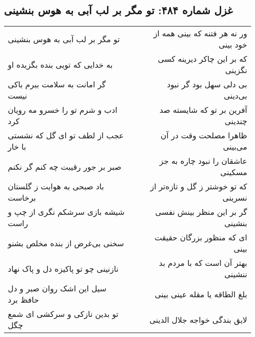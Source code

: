 \begin{center}
\section*{غزل شماره ۴۸۴: تو مگر بر لب آبی به هوس بنشینی}
\label{sec:sh484}
\begin{longtable}{l p{0.5cm} r}
تو مگر بر لب آبی به هوس بنشینی
&&
ور نه هر فتنه که بینی همه از خود بینی
\\
به خدایی که تویی بنده بگزیده او
&&
که بر این چاکر دیرینه کسی نگزینی
\\
گر امانت به سلامت ببرم باکی نیست
&&
بی دلی سهل بود گر نبود بی‌دینی
\\
ادب و شرم تو را خسرو مه رویان کرد
&&
آفرین بر تو که شایسته صد چندینی
\\
عجب از لطف تو ای گل که نشستی با خار
&&
ظاهرا مصلحت وقت در آن می‌بینی
\\
صبر بر جور رقیبت چه کنم گر نکنم
&&
عاشقان را نبود چاره به جز مسکینی
\\
باد صبحی به هوایت ز گلستان برخاست
&&
که تو خوشتر ز گل و تازه‌تر از نسرینی
\\
شیشه بازی سرشکم نگری از چپ و راست
&&
گر بر این منظر بینش نفسی بنشینی
\\
سخنی بی‌غرض از بنده مخلص بشنو
&&
ای که منظور بزرگان حقیقت بینی
\\
نازنینی چو تو پاکیزه دل و پاک نهاد
&&
بهتر آن است که با مردم بد ننشینی
\\
سیل این اشک روان صبر و دل حافظ برد
&&
بلغ الطاقه یا مقله عینی بینی
\\
تو بدین نازکی و سرکشی ای شمع چگل
&&
لایق بندگی خواجه جلال الدینی
\\
\end{longtable}
\end{center}
